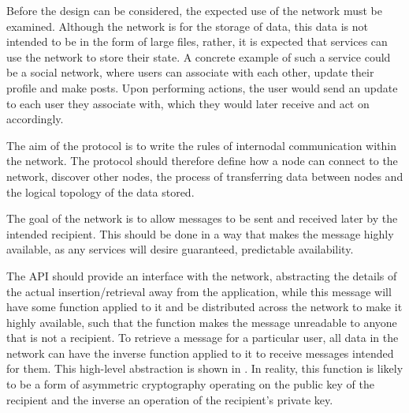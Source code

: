 Before the design can be considered, the expected use of the network must be examined. Although the network is for the storage of data, this data is not intended to be in the form of large files, rather, it is expected that services can use the network to store their state. A concrete example of such a service could be a social network, where users can associate with each other, update their profile and make posts. Upon performing actions, the user would send an update to each user they associate with, which they would later receive and act on accordingly.

The aim of the protocol is to write the rules of internodal communication within the network. The protocol should therefore define how a node can connect to the network, discover other nodes, the process of transferring data between nodes and the logical topology of the data stored.

The goal of the network is to allow messages to be sent and received later by the intended recipient. This should be done in a way that makes the message highly available, as any services will desire guaranteed, predictable availability.

The API should provide an interface with the network, abstracting the details of the actual insertion/retrieval away from the application, while this message will have some function applied to it and be distributed across the network to make it highly available, such that the function makes the message unreadable to anyone that is not a recipient. To retrieve a message for a particular user, all data in the network can have the inverse function applied to it to receive messages intended for them. This high-level abstraction is shown in . In reality, this function is likely to be a form of asymmetric cryptography operating on the public key of the recipient and the inverse an operation of the recipient's private key.